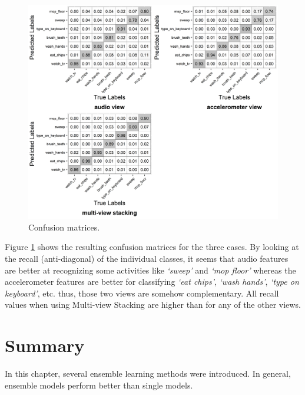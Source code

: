 \documentclass[
  11pt,
]{krantz}
\begin{document}
\begin{figure}

{\centering \includegraphics[width=1\linewidth]{images/stacking_cm} 

}

\caption{Confusion matrices.}\label{fig:stackingCMs}
\end{figure}

Figure \ref{fig:stackingCMs} shows the resulting confusion matrices for the three cases. By looking at the recall (anti-diagonal) of the individual classes, it seems that audio features are better at recognizing some activities like \emph{`sweep'} and \emph{`mop floor'} whereas the accelerometer features are better for classifying \emph{`eat chips'}, \emph{`wash hands'}, \emph{`type on keyboard'}, etc. thus, those two views are somehow complementary. All recall values when using Multi-view Stacking are higher than for any of the other views.

\newpage
\FloatBarrier

\hypertarget{SummaryEnsemble}{%
\section{Summary}\label{SummaryEnsemble}}

In this chapter, several ensemble learning methods were introduced. In general, ensemble models perform better than single models.
\end{document}
